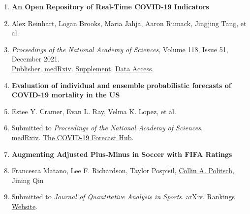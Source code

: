 \documentclass[letterpaper,10pt]{article}
\begin{document}
\begin{enumerate}
\vspace{0.1cm}

\item \textbf{An Open Repository of Real-Time COVID-19 Indicators} 
\vspace{-0.25cm}
\item[] Alex Reinhart, Logan Brooks, Maria Jahja, Aaron Rumack, Jingjing Tang, et al.
\vspace{-0.25cm}
\item[] \emph{Proceedings of the National Academy of Sciences}, Volume 118, Issue 51, December 2021. \\\href{https://doi.org/10.1073/pnas.2111452118}{Publisher}. \href{https://www.medrxiv.org/content/10.1101/2021.07.12.21259660v1}{medRxiv}. \href{https://www.pnas.org/content/pnas/suppl/2021/12/10/2111452118.DCSupplemental/pnas.2111452118.sapp.pdf}{Supplement}. \href{https://cmu-delphi.github.io/delphi-epidata/api/covidcast.html}{Data Access}.

\vspace{0.15cm}

\item \textbf{Evaluation of individual and ensemble probabilistic forecasts of COVID-19 mortality in the US} 
\vspace{-0.25cm}
\item[] Estee Y. Cramer, Evan L. Ray, Velma K. Lopez, et al.
\vspace{-0.25cm}
\item[] Submitted to \emph{Proceedings of the National Academy of Sciences}.\\ 
\href{https://www.medrxiv.org/content/10.1101/2021.02.03.21250974v3}{medRxiv}. \href{https://covid19forecasthub.org/}{The COVID-19 Forecast Hub}.

\vspace{0.15cm}


\item {\bf Augmenting Adjusted Plus-Minus in Soccer with FIFA Ratings}
\vspace{-0.25cm}
\item[] Francesca Matano, Lee F. Richardson, Taylor Pospisil, \underline{Collin A. Politsch}, Jining Qin
\vspace{-0.25cm}
\item[] {Submitted to {\it Journal of Quantitative Analysis in Sports}. \href{https://arxiv.org/abs/1810.08032}{arXiv}. \href{http://intraocular.net/}{Rankings Website}}.
\end{enumerate}
\end{document}
